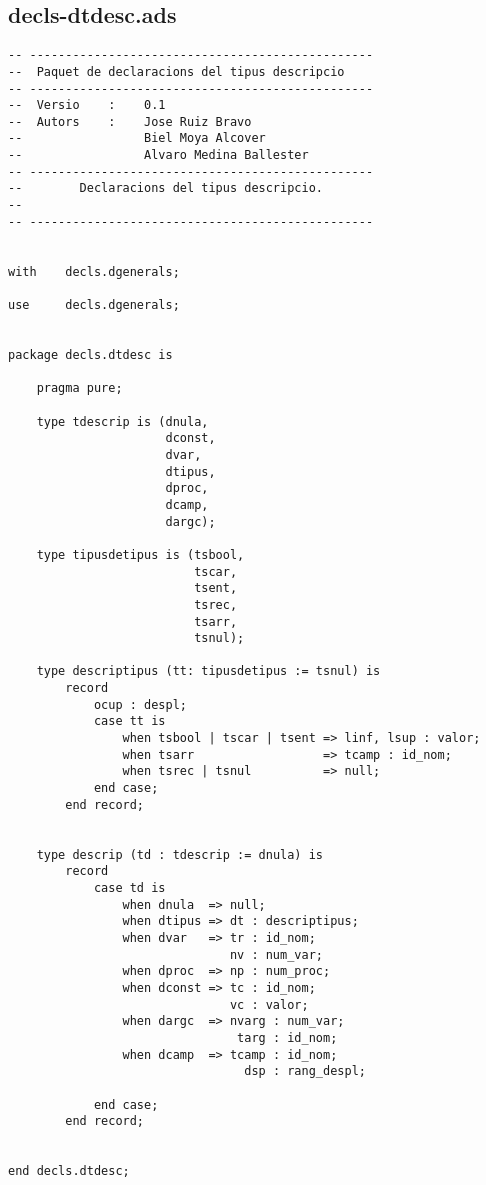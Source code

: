\documentclass[10pt]{report}
\begin{document}
    \subsection{decls-dtdesc.ads}
    \begin{lstlisting}[style=Ada]
-- ------------------------------------------------
--  Paquet de declaracions del tipus descripcio
-- ------------------------------------------------
--  Versio    :    0.1
--  Autors    :    Jose Ruiz Bravo
--                 Biel Moya Alcover
--                 Alvaro Medina Ballester
-- ------------------------------------------------
--        Declaracions del tipus descripcio.
--
-- ------------------------------------------------


with    decls.dgenerals;

use     decls.dgenerals;


package decls.dtdesc is

    pragma pure;

    type tdescrip is (dnula,
                      dconst,
                      dvar,
                      dtipus,
                      dproc,
                      dcamp,
                      dargc);
                       
    type tipusdetipus is (tsbool,
                          tscar,
                          tsent,
                          tsrec,
                          tsarr,
                          tsnul);
    
    type descriptipus (tt: tipusdetipus := tsnul) is
        record
            ocup : despl;
            case tt is
                when tsbool | tscar | tsent => linf, lsup : valor;
                when tsarr                  => tcamp : id_nom;
                when tsrec | tsnul          => null;
            end case;
        end record;
        
    
    type descrip (td : tdescrip := dnula) is
        record
            case td is
                when dnula  => null;
                when dtipus => dt : descriptipus;
                when dvar   => tr : id_nom;
                               nv : num_var;
                when dproc  => np : num_proc;
                when dconst => tc : id_nom;
                               vc : valor;
                when dargc  => nvarg : num_var;
                                targ : id_nom;
                when dcamp  => tcamp : id_nom;
                                 dsp : rang_despl; 

            end case;
        end record;
    
        
end decls.dtdesc;
    \end{lstlisting}
    \newpage
    
\end{document}
